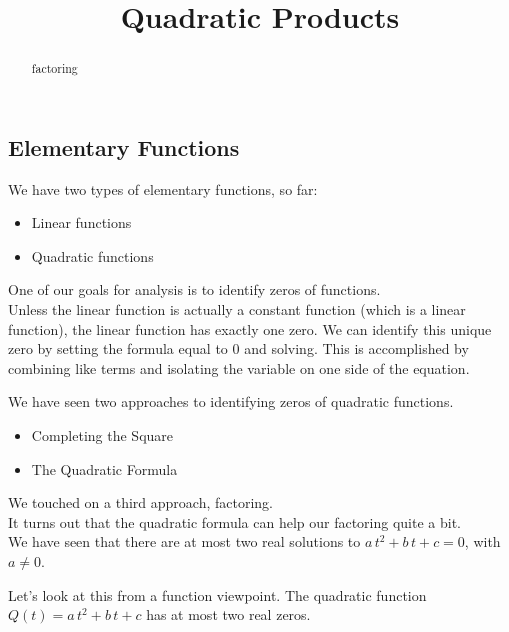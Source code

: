 \documentclass{ximera}
\title{Quadratic Products}
\begin{document}
\begin{abstract}
factoring
\end{abstract}
\maketitle







\subsection*{Elementary Functions}

We have two types of elementary functions, so far:

\begin{itemize}
\item Linear functions
\item Quadratic functions
\end{itemize}

One of our goals for analysis is to identify zeros of functions. \\

Unless the linear function is actually a constant function (which is a linear function), the linear function has exactly one zero. We can identify this unique zero by setting the formula equal to $0$ and solving.  This is accomplished by combining like terms and isolating the variable on one side of the equation.

We have seen two approaches to identifying zeros of quadratic functions.
\begin{itemize}
\item Completing the Square
\item {The Quadratic Formula}
\end{itemize}

We touched on a third approach, factoring. \\

It turns out that the quadratic formula can help our factoring quite a bit. \\









We have seen that there are at most two real solutions to $a \, t^2 + b \, t + c = 0$, with $a \ne 0$. 

Let's look at this from a function viewpoint.  The quadratic function  $Q(t) = a \, t^2 + b \, t + c$ has at most two real zeros.  
\end{document}
